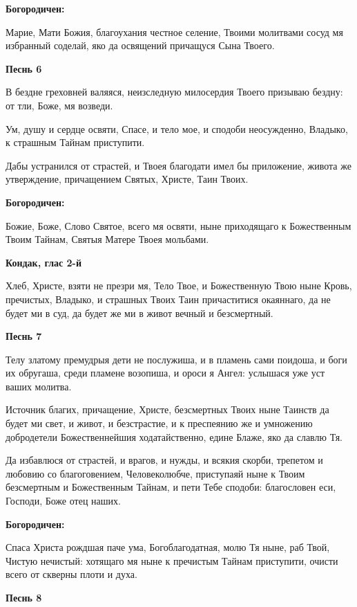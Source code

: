 \medskip
\bfseries Богородичен:\normalfont{}

Марие, Мати Божия, благоухания честное селение, Твоими молитвами сосуд мя избранный соделай, яко да освящений причащуся Сына Твоего.


\medskip
\bfseries Песнь 6\normalfont{}


В бездне греховней валяяся, неизследную милосердия Твоего призываю бездну: от тли, Боже, мя возведи.


Ум, душу и сердце освяти, Спасе, и тело мое, и сподоби неосужденно, Владыко, к страшным Тайнам приступити.


Дабы устранился от страстей, и Твоея благодати имел бы приложение, живота же утверждение, причащением Святых, Христе, Таин Твоих.


\medskip
\bfseries Богородичен:\normalfont{}

Божие, Боже, Слово Святое, всего мя освяти, ныне приходящаго к Божественным Твоим Тайнам, Святыя Матере Твоея мольбами.


\medskip
\bfseries Кондак, глас 2-й\normalfont{}


Хлеб, Христе, взяти не презри мя, Тело Твое, и Божественную Твою ныне Кровь, пречистых, Владыко, и страшных Твоих Таин причаститися окаяннаго, да не будет ми в суд, да будет же ми в живот вечный и безсмертный.


\medskip
\bfseries Песнь 7\normalfont{}


Телу златому премудрыя дети не послужиша, и в пламень сами поидоша, и боги их обругаша, среди пламене возопиша, и ороси я Ангел: услышася уже уст ваших молитва.


Источник благих, причащение, Христе, безсмертных Твоих ныне Таинств да будет ми свет, и живот, и безстрастие, и к преспеянию же и умножению добродетели Божественнейшия ходатайственно, едине Блаже, яко да славлю Тя.


Да избавлюся от страстей, и врагов, и нужды, и всякия скорби, трепетом и любовию со благоговением, Человеколюбче, приступаяй ныне к Твоим безсмертным и Божественным Тайнам, и пети Тебе сподоби: благословен еси, Господи, Боже отец наших.


\medskip
\bfseries Богородичен:\normalfont{}

Спаса Христа рождшая паче ума, Богоблагодатная, молю Тя ныне, раб Твой, Чистую нечистый: хотящаго мя ныне к пречистым Тайнам приступити, очисти всего от скверны плоти и духа.


\medskip
\bfseries Песнь 8\normalfont{}


